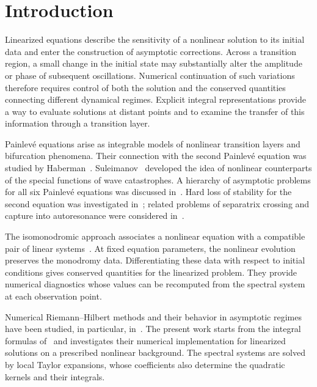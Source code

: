 \section{Introduction}
Linearized equations describe the sensitivity of a nonlinear solution to
its initial data and enter the construction of asymptotic corrections.
Across a transition region, a small change in the initial state may
substantially alter the amplitude or phase of subsequent oscillations.
Numerical continuation of such variations therefore requires control of
both the solution and the conserved quantities connecting different
dynamical regimes. Explicit integral representations provide a way to
evaluate solutions at distant points and to examine the transfer of this
information through a transition layer.

Painlev\'e equations arise as integrable models of nonlinear transition
layers and bifurcation phenomena. Their connection with the second
Painlev\'e equation was studied by Haberman~\cite{Haberman77,Haberman79}.
Suleimanov~\cite{Suleimanov92,Suleimanov94} developed the idea of nonlinear
counterparts of the special functions of wave catastrophes.
A hierarchy of asymptotic problems for all six Painlev\'e equations was
discussed in~\cite{KiselevSuleimanov99}. Hard loss of stability for the
second equation was investigated in~\cite{Kiselev01}; related problems
of separatrix crossing and capture into autoresonance were considered
in~\cite{KiselevGlebov03,KiselevGlebov07}.

The isomonodromic approach associates a nonlinear equation with a
compatible pair of linear systems~\cite{ItsNovokshenov86,FIKN06}.
At fixed equation parameters, the nonlinear evolution preserves the
monodromy data. Differentiating these data with respect to initial
conditions gives conserved quantities for the linearized problem.
They provide numerical diagnostics whose values can be recomputed from
the spectral system at each observation point.

Numerical Riemann--Hilbert methods and their behavior in asymptotic regimes
have been studied, in particular, in~\cite{OlverTrogdon12}.
The present work starts from the integral formulas
of~\cite{Kiselev24,Kiselev26} and investigates their numerical implementation
for linearized solutions on a prescribed nonlinear background.
The spectral systems are solved by local Taylor expansions, whose
coefficients also determine the quadratic kernels and their integrals.

